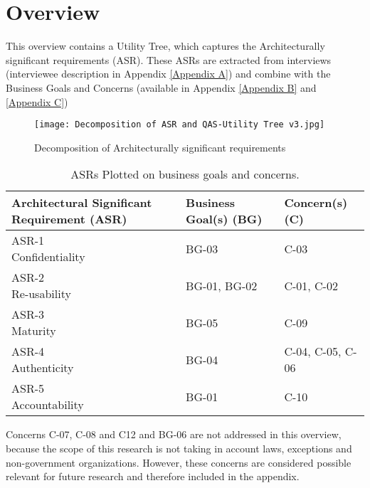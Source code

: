 \chapter{Overview}\label{s:overview}

This overview contains a Utility Tree, which captures the Architecturally significant requirements (ASR). These ASRs are extracted from interviews (interviewee description in Appendix  \ref{Appendix A}) and combine with the Business Goals and Concerns (available in Appendix \ref{Appendix B} and  \ref{Appendix C}) 

\graphicspath{ {./images/} }
\begin{figure}
\texttt{[image: Decomposition of ASR and QAS-Utility Tree v3.jpg]}\\
\caption{Decomposition of Architecturally significant requirements}
\label{fig:ASR1}
\end{figure}

\begin{table}[h!]
\centering
\begin{tabular}{||l l l||} 
 \hline
 Architectural Significant Requirement (ASR) & Business Goal(s) (BG) & Concern(s) (C)\\ [0.5ex] 
 \hline\hline
 \makecell{ASR-1 \\ Confidentiality} & BG-03 & C-03 \\ 
 \hline
\makecell{ASR-2 \\ Re-usability} & BG-01, BG-02 & C-01, C-02  \\
  \hline
\makecell{ASR-3 \\ Maturity} & BG-05 &  C-09  \\
  \hline
\makecell{ASR-4 \\ Authenticity} & BG-04 & C-04, C-05, C-06 \\
  \hline
\makecell{ASR-5 \\ Accountability} & BG-01 & C-10  \\ [1ex] 
 \hline
\end{tabular}
\caption{ASRs Plotted on business goals and concerns.}
\label{ASR_BG_C}
\end{table}

Concerns C-07, C-08 and C12 and BG-06 are not addressed in this overview, because the scope of this research is not taking in account laws, exceptions and non-government organizations. However, these concerns are considered possible relevant for future research and therefore included in the appendix.


